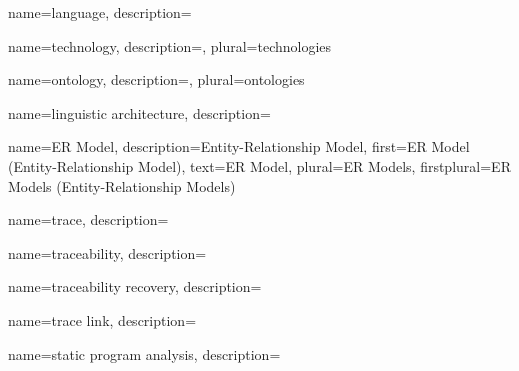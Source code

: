 {
    name={language},
    description={}
}

{
    name={technology},
    description={},
    plural={technologies}
}

{
    name={ontology},
    description={},
    plural={ontologies}
}


{
    name={linguistic architecture},
    description={}
}

{
    name={ER Model},
    description={Entity-Relationship Model},
    first={ER Model (Entity-Relationship Model)},
    text={ER Model},
    plural={ER Models},
    firstplural={ER Models (Entity-Relationship Models)}
}

{
    name={trace},
    description={}
}

{
    name={traceability},
    description={}
}

{
    name={traceability recovery},
    description={}
}

{
    name={trace link},
    description={}
}

{
    name={static program analysis},
    description={}
}